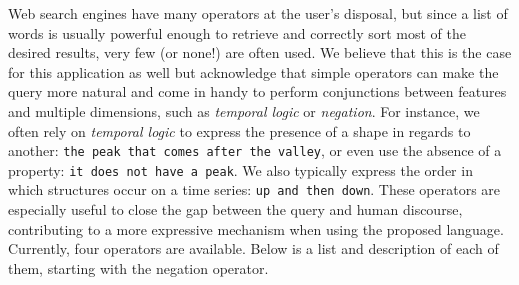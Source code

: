 Web search engines have many operators at the user’s disposal, but since a list of words is usually powerful enough to retrieve and correctly sort most of the desired results, very few (or none!) are often used. We believe that this is the case for this application as well but acknowledge that simple operators can make the query more natural and come in handy to perform conjunctions between features and multiple dimensions, such as \textit{temporal logic} or \textit{negation}. For instance, we often rely on \textit{temporal logic} to express the presence of a shape in regards to another: \texttt{the peak that comes after the valley}, or even use the absence of a property: \texttt{it does not have a peak}. We also typically express the order in which structures occur on a time series: \texttt{up and then down}. These operators are especially useful to close the gap between the query and human discourse, contributing to a more expressive mechanism when using the proposed language. Currently, four operators are available. Below is a list and description of each of them, starting with the negation operator.
\par
